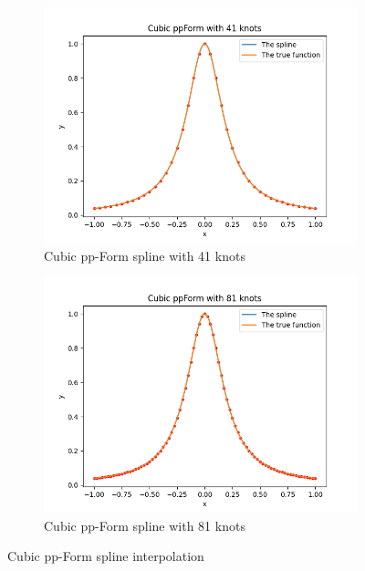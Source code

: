 \documentclass[a4paper]{article}
\begin{document}
\begin{figure}[htbp]
  \begin{subfigure}[b]{0.45\textwidth}
    \includegraphics[width = \textwidth]{../figure/Cubic ppForm with 41 knots.png}
    \caption{Cubic pp-Form spline with 41 knots}
  \end{subfigure}
  \hfill
  \begin{subfigure}[b]{0.45\textwidth}
    \includegraphics[width = \textwidth]{../figure/Cubic ppForm with 81 knots.png}
    \caption{Cubic pp-Form spline with 81 knots}
  \end{subfigure}

  \caption{Cubic pp-Form spline interpolation}
  \label{fig:cubic_ppform_spline}
\end{figure}
\end{document}
